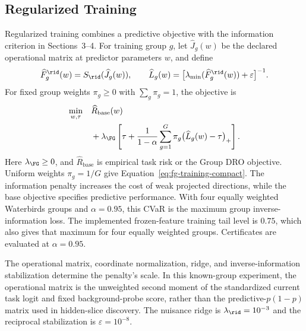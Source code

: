 \subsection{Regularized Training}
\label{app:regularized-training}

Regularized training combines a predictive objective with the information criterion in Sections~3--4. For training group $g$, let $\widehat J_g(w)$ be the declared operational matrix at predictor parameters $w$, and define
\begin{equation}
\widehat F_g^{\rid}(w)=S_{\rid}(\widehat J_g(w)),\qquad
\widehat L_g(w)=\bigl[\lambda_{\min}(\widehat F_g^{\rid}(w))+\varepsilon\bigr]^{-1}.
\end{equation}
For fixed group weights $\pi_g\geq0$ with $\sum_g\pi_g=1$, the objective is
\begin{equation}
\begin{split}
\min_{w,\tau}\quad &\widehat R_{\mathrm{base}}(w)\\
&+\lambda_{\FG}\left[\tau+
\frac{1}{1-\alpha}\sum_{g=1}^{G}\pi_g
\bigl(\widehat L_g(w)-\tau\bigr)_+\right].
\end{split}
\label{eq:fisher-glass-training-objective}
\end{equation}
Here $\lambda_{\FG}\geq0$, and $\widehat R_{\mathrm{base}}$ is empirical task risk or the Group DRO objective. Uniform weights $\pi_g=1/G$ give Equation~\ref{eq:fg-training-compact}. The information penalty increases the cost of weak projected directions, while the base objective specifies predictive performance. With four equally weighted Waterbirds groups and $\alpha=0.95$, this CVaR is the maximum group inverse-information loss. The implemented frozen-feature training tail level is $0.75$, which also gives that maximum for four equally weighted groups. Certificates are evaluated at $\alpha=0.95$.

The operational matrix, coordinate normalization, ridge, and inverse-information stabilization determine the penalty's scale. In this known-group experiment, the operational matrix is the unweighted second moment of the standardized current task logit and fixed background-probe score, rather than the predictive-$p(1-p)$ matrix used in hidden-slice discovery. The nuisance ridge is $\lambda_{\rid}=10^{-3}$ and the reciprocal stabilization is $\varepsilon=10^{-8}$.

